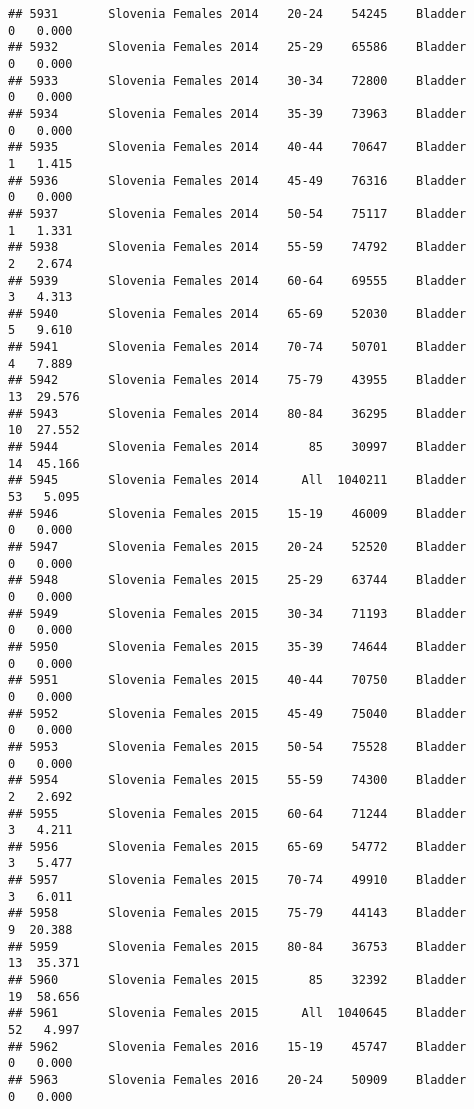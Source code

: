 \documentclass[
]{article}
\begin{document}
\begin{verbatim}
## 5931       Slovenia Females 2014    20-24    54245    Bladder      0   0.000
## 5932       Slovenia Females 2014    25-29    65586    Bladder      0   0.000
## 5933       Slovenia Females 2014    30-34    72800    Bladder      0   0.000
## 5934       Slovenia Females 2014    35-39    73963    Bladder      0   0.000
## 5935       Slovenia Females 2014    40-44    70647    Bladder      1   1.415
## 5936       Slovenia Females 2014    45-49    76316    Bladder      0   0.000
## 5937       Slovenia Females 2014    50-54    75117    Bladder      1   1.331
## 5938       Slovenia Females 2014    55-59    74792    Bladder      2   2.674
## 5939       Slovenia Females 2014    60-64    69555    Bladder      3   4.313
## 5940       Slovenia Females 2014    65-69    52030    Bladder      5   9.610
## 5941       Slovenia Females 2014    70-74    50701    Bladder      4   7.889
## 5942       Slovenia Females 2014    75-79    43955    Bladder     13  29.576
## 5943       Slovenia Females 2014    80-84    36295    Bladder     10  27.552
## 5944       Slovenia Females 2014       85    30997    Bladder     14  45.166
## 5945       Slovenia Females 2014      All  1040211    Bladder     53   5.095
## 5946       Slovenia Females 2015    15-19    46009    Bladder      0   0.000
## 5947       Slovenia Females 2015    20-24    52520    Bladder      0   0.000
## 5948       Slovenia Females 2015    25-29    63744    Bladder      0   0.000
## 5949       Slovenia Females 2015    30-34    71193    Bladder      0   0.000
## 5950       Slovenia Females 2015    35-39    74644    Bladder      0   0.000
## 5951       Slovenia Females 2015    40-44    70750    Bladder      0   0.000
## 5952       Slovenia Females 2015    45-49    75040    Bladder      0   0.000
## 5953       Slovenia Females 2015    50-54    75528    Bladder      0   0.000
## 5954       Slovenia Females 2015    55-59    74300    Bladder      2   2.692
## 5955       Slovenia Females 2015    60-64    71244    Bladder      3   4.211
## 5956       Slovenia Females 2015    65-69    54772    Bladder      3   5.477
## 5957       Slovenia Females 2015    70-74    49910    Bladder      3   6.011
## 5958       Slovenia Females 2015    75-79    44143    Bladder      9  20.388
## 5959       Slovenia Females 2015    80-84    36753    Bladder     13  35.371
## 5960       Slovenia Females 2015       85    32392    Bladder     19  58.656
## 5961       Slovenia Females 2015      All  1040645    Bladder     52   4.997
## 5962       Slovenia Females 2016    15-19    45747    Bladder      0   0.000
## 5963       Slovenia Females 2016    20-24    50909    Bladder      0   0.000

\end{verbatim}
\end{document}
